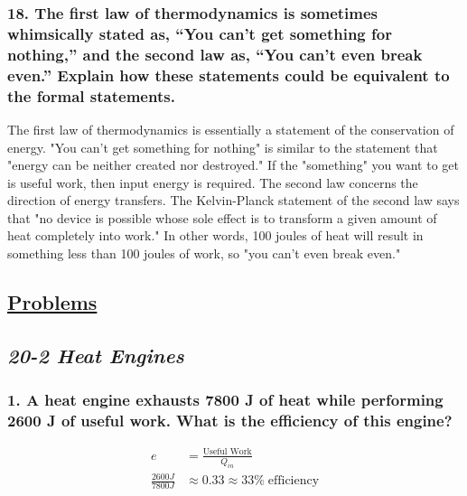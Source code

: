 \documentclass{article}
\begin{document}
\subsubsection*{
    18. The first law of thermodynamics is sometimes whimsically stated as,
    “You can’t get something for nothing,” and the second law as,
    “You can’t even break even.” Explain how these statements could be equivalent to the formal statements.
}
The first law of thermodynamics is essentially a statement of the conservation of
energy. "You can't get something for nothing" is similar to the statement that
"energy can be neither created nor destroyed." If the "something" you want to
get is useful work, then input energy is required. The second law concerns the
direction of energy transfers. The Kelvin-Planck statement of the second law says
that "no device is possible whose sole effect is to transform a given amount of
heat completely into work." In other words, 100 joules of heat will result in
something less than 100 joules of work, so "you can't even break even."
\newpage
\begin{center}
    \section*{\textbf{\underline {Problems}}}
    \subsection*{\textbf{\textit{20-2 Heat Engines}}}
\end{center}
\subsubsection*{
    1. A heat engine exhausts 7800 J of heat while performing
    2600 J of useful work. What is the efficiency of this engine?
} 
\begin{align*}
    e &= \displaystyle\frac{\text{Useful Work}}{Q_{in}} \\
    \displaystyle\frac{2600 J}{7800J} &\approx 0.33 \approx 33\% \;\text{efficiency}
\end{align*}
\end{document}
